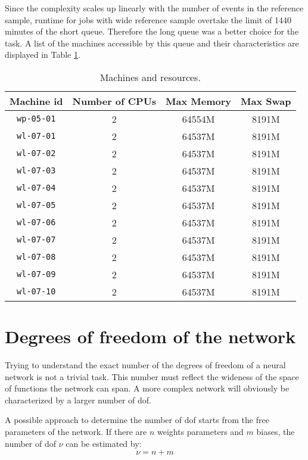 \noindent
Since the complexity scales up linearly with the number of events in the reference sample, runtime for jobs with wide reference sample overtake the limit of 1440 minutes of the short queue. Therefore the long queue was a better choice for the task. A list of the machines accessible by this queue and their characteristics are displayed in Table \ref{tab:LONG_QUEUE_MACHINES}.

\begin{table}[H]
	\centering
	\begin{tabular}{c c c c}
	\toprule
	Machine id	&	Number of CPUs	&	Max Memory		&	Max Swap	\\
	\midrule
	\texttt{wp-05-01}	&	2	&	64554M  &	8191M	\\
	\texttt{wl-07-01}	&	2	&	64537M  &	8191M	\\
	\texttt{wl-07-02}	&	2	&	64537M  &	8191M	\\
	\texttt{wl-07-03}	&	2	&	64537M  &	8191M	\\
	\texttt{wl-07-04}	&	2	&	64537M  &	8191M	\\
	\texttt{wl-07-05}	&	2	&	64537M  &	8191M	\\
	\texttt{wl-07-06}	&	2	&	64537M  &	8191M	\\
	\texttt{wl-07-07}	&	2	&	64537M  &	8191M	\\
	\texttt{wl-07-08}	&	2	&	64537M  &	8191M	\\
	\texttt{wl-07-09}	&	2	&	64537M  &	8191M	\\
	\texttt{wl-07-10}	&	2	&	64537M  &	8191M	\\
	\bottomrule
	\end{tabular}
	\caption{Machines and resources.}
	\label{tab:LONG_QUEUE_MACHINES}
\end{table}





\section{Degrees of freedom of the network}
Trying to understand the exact number of the degrees of freedom of a neural network is not a trivial task. This number must reflect the wideness of the space of functions the network can span. A more complex network will obviously be characterized by a larger number of dof.

A possible approach to determine the number of dof starts from the free parameters of the network. If there are $n$ weights parameters and $m$ biases, the number of dof $\nu$ can be estimated by:
\begin{equation}
	\nu = n + m
\end{equation}

